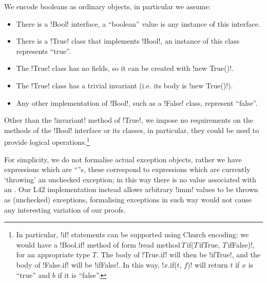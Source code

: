 We encode booleans as ordinary objects, in particular we assume:
\begin{itemize}
\item There is a \Q!Bool! interface, a ``boolean'' value is any instance of this interface.
\item There is a \Q!True! class that implements \Q!Bool!, an instance of this class represents ``true''.
\item The \Q!True! class has no fields, so it can be created with \Q!new True()!.
\item The \Q!True! class has a trivial invariant (i.e. its body is \Q!new True()!).
\item Any other implementation of \Q!Bool!, such as a \Q!False! class, represent ``false''.
\end{itemize}
Other than the \Q!invariant! method of \Q!True!, we impose no requirements on the methods of the \Q!Bool! interface or its classes, in particular, they could be used to provide logical operations.\footnote{
In particular, \Q!if! statements can be supported using Church encoding: we would have a \Q!Bool.if! method of form \Q!read method$\,T\,$if($T\,$ifTrue, $T\,$ifFalse)!, for an appropriate type $T$.
The body of \Q!True.if! will then be \Q!ifTrue!, and the body of \Q!False.if! will be \Q!ifFalse!. In this way, \Q!$x$.if($t$, $f$)! will return $t$ if $x$ is ``true'' and $b$ if it is ``false''.}

For simplicity, we do not formalise actual exception objects, rather we have expressions which are ``\error''s, these correspond to expressions which are currently `throwing' an unchecked exception;
in this way there is no value associated with an \error.
Our L42 implementation instead allows arbitrary \Q!imm! values to be thrown as (unchecked) exceptions, formalising exceptions in such way would not cause any interesting variation of our proofs.

